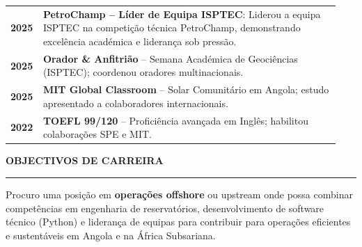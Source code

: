 \documentclass[10pt,a4paper]{article}
\renewcommand{\textbf}[1]{{\bfseries\color{cvgold}#1}}
\newcommand{\mainSection}[1]{%
  \vspace{1pt}%
  {\bfseries\color{cvgold}\large\MakeUppercase{#1}}%
  \par\vspace{0pt}%
  {\color{cvgold}\rule{\linewidth}{0.9pt}}%
  \par\vspace{1pt}%
}
\begin{document}
\begin{minipage}[t]{\dimexpr 0.705\paperwidth - 26pt}
  \renewcommand{\arraystretch}{1.40}
  \begin{tabular}{@{} p{0.06\linewidth} p{0.88\linewidth} @{}}
    {\bfseries\color{cvgold}2025} &
      \textbf{PetroChamp -- Líder de Equipa ISPTEC}: Liderou a equipa ISPTEC na competição técnica PetroChamp, demonstrando excelência académica e liderança sob pressão.\\
    {\bfseries\color{cvgold}2025} &
      \textbf{Orador \& Anfitrião} -- Semana Académica de Geociências (ISPTEC); coordenou oradores multinacionais.\\
    {\bfseries\color{cvgold}2025} &
      \textbf{MIT Global Classroom} -- Solar Comunitário em Angola; estudo apresentado a colaboradores internacionais.\\
    {\bfseries\color{cvgold}2022} &
      \textbf{TOEFL 99/120} -- Proficiência avançada em Inglês; habilitou colaborações SPE e MIT.\\
  \end{tabular}
  \renewcommand{\arraystretch}{1}

  \mainSection{Objectivos de Carreira}
  Procuro uma posição em \textbf{operações offshore} ou upstream onde possa combinar
  competências em engenharia de reservatórios, desenvolvimento de software técnico
  (Python) e liderança de equipas para contribuir para operações eficientes e
  sustentáveis em Angola e na África Subsariana.

  \vspace{2pt}

\end{minipage}
\end{document}
